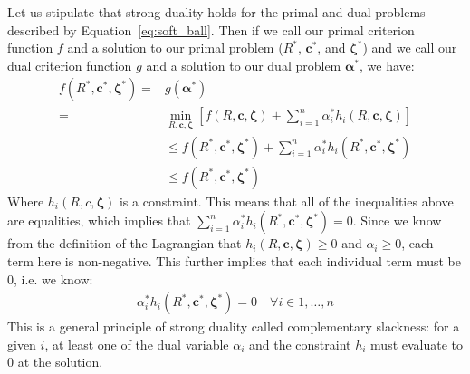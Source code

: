 \documentclass{article}
\begin{document}
Let us stipulate that strong duality holds for the primal and dual problems described by Equation~\ref{eq:soft_ball}. Then if we call our primal criterion function $f$ and a solution to our primal problem ($R^{*}$, $\boldsymbol{c}^{*}$, and $\boldsymbol{\zeta}^{*}$) and we call our dual criterion function $g$ and a solution to our dual problem $\boldsymbol{\alpha}^{*}$, we have:
\begin{align*}
    f(R^{*}, \boldsymbol{c}^{*}, \boldsymbol{\zeta}^{*}) =& g(\boldsymbol{\alpha}^{*}) \\
    =& \mathop{\mathrm{min}}_{R,\boldsymbol{c}, \boldsymbol{\zeta}} \left[ f(R, \boldsymbol{c},\boldsymbol{\zeta}) + \sum_{i=1}^{n} \alpha_i^{*} h_i(R, \boldsymbol{c}, \boldsymbol{\zeta}) \right] \\
    &\le f(R^{*}, \boldsymbol{c}^{*}, \boldsymbol{\zeta}^{*}) + \sum_{i=1}^{n} \alpha_i^{*} h_i(R^{*}, \boldsymbol{c}^{*}, \boldsymbol{\zeta}^{*}) \\ 
    &\le f(R^{*}, \boldsymbol{c}^{*}, \boldsymbol{\zeta}^{*})
\end{align*}
Where $h_i(R, c, \boldsymbol{\zeta})$ is a constraint. This means that all of the inequalities above are equalities, which implies that $\sum_{i=1}^{n} \alpha_i^{*} h_i(R^{*}, \boldsymbol{c}^{*}, \boldsymbol{\zeta}^{*}) = 0$. Since we know from the definition of the Lagrangian that $h_i(R, \boldsymbol{c}, \boldsymbol{\zeta}) \ge 0$ and $\alpha_i \ge 0$, each term here is non-negative. This further implies that each individual term must be 0, i.e. we know:
\begin{align*}
    \alpha_i^{*} h_i(R^{*}, \boldsymbol{c}^{*},\boldsymbol{\zeta}^{*}) = 0\quad \forall i \in {1,\dotsc,n}
\end{align*}
This is a general principle of strong duality called complementary slackness: for a given $i$, at least one of the dual variable $\alpha_i$ and the constraint $h_i$ must evaluate to 0 at the solution.
\end{document}
